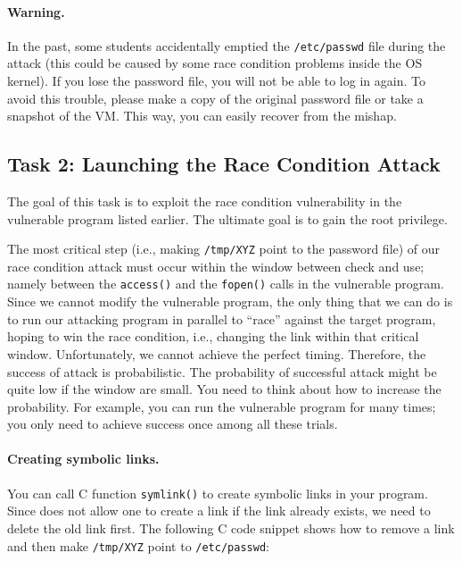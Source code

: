 \paragraph{Warning.}
In the past, some students accidentally emptied the {\tt /etc/passwd} file 
during the attack (this could be caused by some race condition problems
inside the OS kernel). If you lose
the password file, you will not be able to log in again. To avoid this 
trouble, please make a copy of the original password file or take a
snapshot of the VM. This way, you can easily recover from the mishap. 



\subsection{Task 2: Launching the Race Condition Attack}

The goal of this task is to exploit the race condition vulnerability in 
the vulnerable \setuid program listed earlier. The ultimate goal is to gain
the root privilege. 

The most critical step (i.e., making
\texttt{/tmp/XYZ} point to the password file) of our race condition attack must occur within
the window between check and use; namely between the \texttt{access()} 
and the \texttt{fopen()} calls in the vulnerable program.
Since we cannot modify the vulnerable program,
the only thing that we can do is to run our attacking program in parallel
to ``race'' against the target program, 
hoping to win the race condition, i.e., changing the link 
within that critical window.
Unfortunately, we cannot achieve the perfect timing. Therefore, 
the success of attack is probabilistic.
The probability of successful attack might be quite low if the window
are small. You need to think about how to increase the 
probability. For example,  you can run the vulnerable program for many
times; you only need to achieve success once among all these trials.



\paragraph{Creating symbolic links.}
You can call C function {\tt symlink()} to create symbolic links in your program.
Since \linux does not allow one to create a link if the link already exists,
we need to delete the old link first.
The following C code snippet shows how to remove a link and then make
{\tt /tmp/XYZ} point to {\tt /etc/passwd}:

